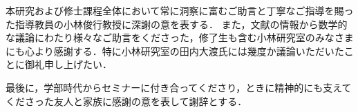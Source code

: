 本研究および修士課程全体において常に洞察に富むご助言と丁寧なご指導を賜った指導教員の小林俊行教授に深謝の意を表する．%
また，文献の情報から数学的な議論にわたり様々なご助言をくださった，修了生も含む小林研究室のみなさまにも心より感謝する．特に小林研究室の田内大渡氏には幾度か議論いただいたことに御礼申し上げたい．

最後に，学部時代からセミナーに付き合ってくださり，ときに精神的にも支えてくださった友人と家族に感謝の意を表して謝辞とする．
